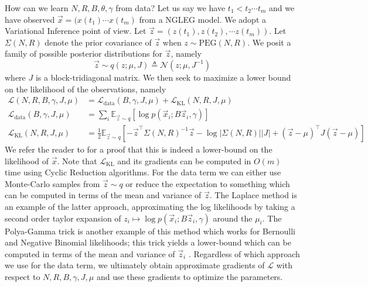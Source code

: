 \documentclass{article}
\theoremstyle{definition}
\newcommand{\PEG}{\mathrm{PEG}}
\begin{document}
How can we learn $N,R,B,\theta,\gamma$ from data?  Let us say we have $t_1 < t_2 \cdots t_m$ and we have observed $\vec x = (x(t_1) \cdots x(t_m)$ from a NGLEG model.  We adopt a Variational Inference point of view.  Let $\vec z=(z(t_1),z(t_2),\cdots z(t_m))$.  Let $\Sigma(N,R)$ denote the prior covariance of $\vec z$ when $z \sim \PEG(N,R)$.  We posit a family of possible posterior distributions for $\vec z$, namely
\[
\vec z \sim q(z;\mu,J) \triangleq \mathcal{N}(z;\mu,J^{-1})
\]
where $J$ is a block-tridiagonal matrix.  We then seek to maximize a lower bound on the likelihood of the observations, namely 
\begin{align*}
\mathcal{L}(N,R,B,\gamma,J,\mu) 
   &= \mathcal{L}_\mathrm{data}(B,\gamma,J,\mu) + \mathcal{L}_\mathrm{KL}(N,R,J,\mu)\\
\mathcal{L}_\mathrm{data}(B,\gamma,J,\mu)&= \sum_i \mathbb{E}_{\vec z \sim q} \left[\log p(\vec x_i ; B\vec z_i,\gamma)\right]\\
\mathcal{L}_\mathrm{KL}(N,R,J,\mu) &= \frac{1}{2}\mathbb{E}_{\vec z \sim q} \left[ -\vec z^\top \Sigma(N,R)^{-1} \vec z -\log |\Sigma(N,R)||J| + (\vec z - \mu)^\top J (\vec z - \mu)\right]
\end{align*}
We refer the reader to \cite{blei2017variational} for a proof that this is indeed a lower-bound on the likelihood of $\vec x$.  Note that $\mathcal{L}_\mathrm{KL}$ and its gradients can be computed in $O(m)$ time using Cyclic Reduction algorithms.  For the data term we can either use Monte-Carlo samples from $\vec z \sim q$ or reduce the expectation to something which can be computed in terms of the mean and variance of $\vec z$.  The Laplace method is an example of the latter approach, approximating the log likelihoods by taking a second order taylor expansion of $z_i \mapsto \log p(\vec x_i ; B\vec z_i,\gamma)$ around the $\mu_i$.  The Polya-Gamma trick is another example of this method which works for Bernoulli and Negative Binomial likelihoods; this trick yields a lower-bound which can be computed in terms of the mean and variance of $\vec z_i$ \cite{polson2013bayesian}.   Regardless of which approach we use for the data term, we ultimately obtain approximate gradients of $\mathcal{L}$ with respect to $N,R,B,\gamma,J,\mu$ and use these gradients to optimize the parameters.  





\end{document}
